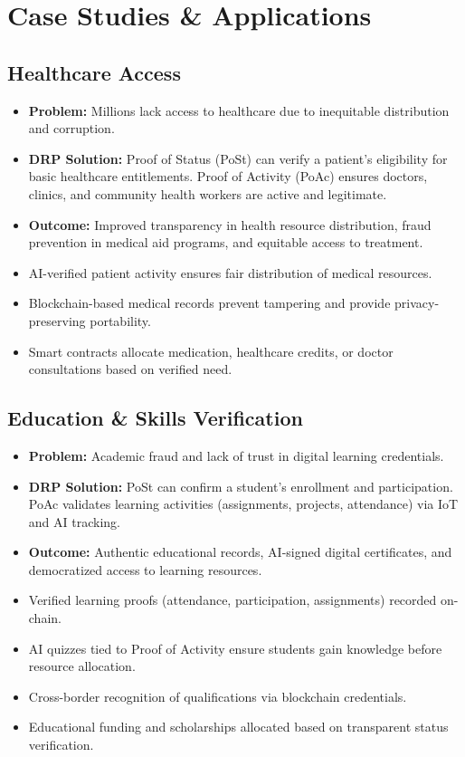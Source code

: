 \documentclass[11pt,a4paper]{article}
\begin{document}
\section{Case Studies \& Applications}

\subsection{Healthcare Access}
\begin{itemize}
    \item \textbf{Problem:} Millions lack access to healthcare due to inequitable distribution and corruption.
    \item \textbf{DRP Solution:} Proof of Status (PoSt) can verify a patient's eligibility for basic healthcare entitlements. Proof of Activity (PoAc) ensures doctors, clinics, and community health workers are active and legitimate.
    \item \textbf{Outcome:} Improved transparency in health resource distribution, fraud prevention in medical aid programs, and equitable access to treatment.
    \item AI-verified patient activity ensures fair distribution of medical resources.
    \item Blockchain-based medical records prevent tampering and provide privacy-preserving portability.
    \item Smart contracts allocate medication, healthcare credits, or doctor consultations based on verified need.
\end{itemize}

\subsection{Education \& Skills Verification}
\begin{itemize}
    \item \textbf{Problem:} Academic fraud and lack of trust in digital learning credentials.
    \item \textbf{DRP Solution:} PoSt can confirm a student's enrollment and participation. PoAc validates learning activities (assignments, projects, attendance) via IoT and AI tracking.
    \item \textbf{Outcome:} Authentic educational records, AI-signed digital certificates, and democratized access to learning resources.
    \item Verified learning proofs (attendance, participation, assignments) recorded on-chain.
    \item AI quizzes tied to Proof of Activity ensure students gain knowledge before resource allocation.
    \item Cross-border recognition of qualifications via blockchain credentials.
    \item Educational funding and scholarships allocated based on transparent status verification.
\end{itemize}
\end{document}
